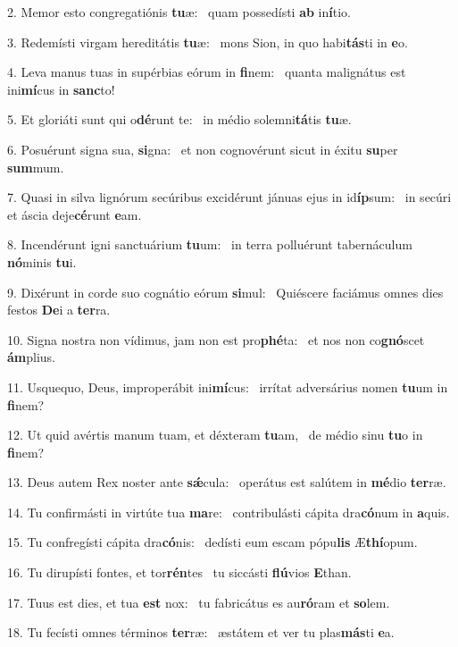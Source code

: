 2. Memor esto congregatiónis \textbf{tu}æ: \ast\  quam possedísti \textbf{ab} in\textbf{í}tio.\

3. Redemísti virgam hereditátis \textbf{tu}æ: \ast\  mons Sion, in quo habi\textbf{tás}ti in \textbf{e}o.\

4. Leva manus tuas in supérbias eórum in \textbf{fi}nem: \ast\  quanta malignátus est ini\textbf{mí}cus in \textbf{sanc}to!\

5. Et gloriáti sunt qui o\textbf{dé}runt te: \ast\  in médio solemni\textbf{tá}tis \textbf{tu}æ.\

6. Posuérunt signa sua, \textbf{si}gna: \ast\  et non cognovérunt sicut in éxitu \textbf{su}per \textbf{sum}mum.\

7. Quasi in silva lignórum secúribus excidérunt jánuas ejus in id\textbf{íp}sum: \ast\  in secúri et áscia deje\textbf{cé}runt \textbf{e}am.\

8. Incendérunt igni sanctuárium \textbf{tu}um: \ast\  in terra polluérunt tabernáculum \textbf{nó}minis \textbf{tu}i.\

9. Dixérunt in corde suo cognátio eórum \textbf{si}mul: \ast\  Quiéscere faciámus omnes dies festos \textbf{De}i a \textbf{ter}ra.\

10. Signa nostra non vídimus, jam non est pro\textbf{phé}ta: \ast\  et nos non co\textbf{gnó}scet \textbf{ám}plius.\

11. Usquequo, Deus, improperábit ini\textbf{mí}cus: \ast\  irrítat adversárius nomen \textbf{tu}um in \textbf{fi}nem?\

12. Ut quid avértis manum tuam, et déxteram \textbf{tu}am, \ast\  de médio sinu \textbf{tu}o in \textbf{fi}nem?\

13. Deus autem Rex noster ante \textbf{sǽ}cula: \ast\  operátus est salútem in \textbf{mé}dio \textbf{ter}ræ.\

14. Tu confirmásti in virtúte tua \textbf{ma}re: \ast\  contribulásti cápita dra\textbf{có}num in \textbf{a}quis.\

15. Tu confregísti cápita dra\textbf{có}nis: \ast\  dedísti eum escam pópu\textbf{lis} Æ\textbf{thí}opum.\

16. Tu dirupísti fontes, et tor\textbf{rén}tes \ast\  tu siccásti \textbf{flú}vios \textbf{E}than.\

17. Tuus est dies, et tua \textbf{est} nox: \ast\  tu fabricátus es au\textbf{ró}ram et \textbf{so}lem.\

18. Tu fecísti omnes términos \textbf{ter}ræ: \ast\  æstátem et ver tu plas\textbf{más}ti \textbf{e}a.\

